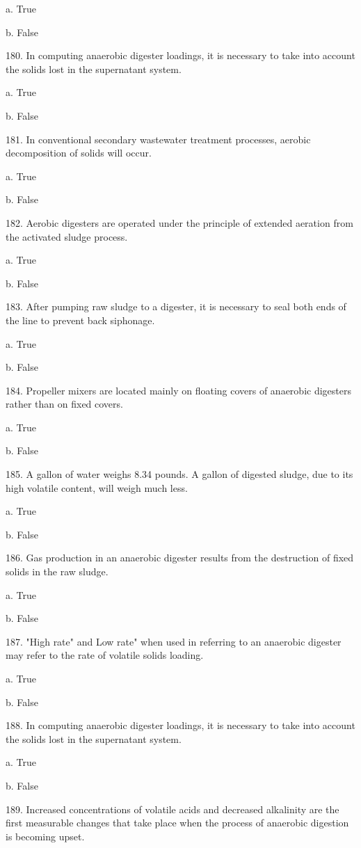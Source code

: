 \documentclass{article}
\begin{document}
a. True 

b. False 


180. In computing anaerobic digester loadings, it is necessary to take into account the solids lost in the supernatant system. 

a. True 

b. False 


181. In conventional secondary wastewater treatment processes, aerobic decomposition of solids will occur. 

a. True 

b. False 


182. Aerobic digesters are operated under the principle of extended aeration from the activated sludge process. 

a. True 

b. False 


183. After pumping raw sludge to a digester, it is necessary to seal both ends of the line to prevent back siphonage. 

a. True 

b. False 


184. Propeller mixers are located mainly on floating covers of anaerobic digesters rather than on fixed covers. 

a. True 

b. False 


185. A gallon of water weighs 8.34 pounds. A gallon of digested sludge, due to its high volatile content, will weigh much less. 

a. True 

b. False 


186. Gas production in an anaerobic digester results from the destruction of fixed solids in the raw sludge. 

a. True 

b. False 


187. "High rate" and Low rate" when used in referring to an anaerobic digester may refer to the rate of volatile solids loading. 

a. True 

b. False 


188. In computing anaerobic digester loadings, it is necessary to take into account the solids lost in the supernatant system. 

a. True 

b. False 


189. Increased concentrations of volatile acids and decreased alkalinity are the first measurable changes that take place when the process of anaerobic digestion is becoming upset. 
\end{document}
